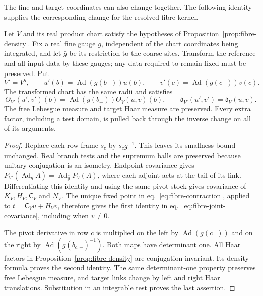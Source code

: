\documentclass[11pt,letterpaper,reqno]{amsart}
\makeatletter
\numberwithin{equation}{section}
\renewcommand{\eqref}[1]{\textup{eq.~\ref{#1}}}
\theoremstyle{definition}
\newcommand{\ms@majorstart}{%
  \pushQED{\qed}\renewcommand{\qedsymbol}{$\blacksquare\square$}}
\newenvironment{corollary}[1][]{\ms@majorstart\ms@corollary[#1]}
  {\popQED\endms@corollary}
\theoremstyle{remark}
\makeatother
\begin{document}
The fine and target coordinates can also change together. The following
identity supplies the corresponding change for the resolved fibre kernel.

\begin{corollary}[Joint gauge covariance]\label{cor:fibre-gauge-covariance}
Let \(V\) and its real product chart satisfy the hypotheses of
Proposition~\ref{prop:fibre-density}. Fix a real fine gauge \(g\),
independent of the chart coordinates being integrated, and let
\(\bar g\) be its restriction to the coarse sites. Transform the
reference and all input data by these gauges; any data required to
remain fixed must be preserved. Put
\[
 V'=V^g,\qquad
 u'(b)=\operatorname{Ad}(g(b_-))u(b),\qquad
 v'(c)=\operatorname{Ad}(\bar g(c_-))v(c).
\]
The transformed chart has the same radii and satisfies
\begin{equation}\label{eq:fibre-joint-covariance}
 \Theta_{V'}(u',v')(b)
   =\operatorname{Ad}(g(b_-))\Theta_V(u,v)(b),\qquad
 \mathfrak d_{V'}(u',v')=\mathfrak d_V(u,v).
\end{equation}
The free Lebesgue measure and target Haar measure are preserved.
Every extra factor, including a test domain, is pulled back through
the inverse change on all of its arguments.
\end{corollary}

\begin{proof}
Replace each row frame \(s_c\) by \(s_cg^{-1}\). This leaves its
smallness bound unchanged. Real branch tests and the supremum balls
are preserved because unitary conjugation is an isometry. Endpoint
covariance gives
\(P_{V'}(\operatorname{Ad}_g A)=\operatorname{Ad}_{\bar g}P_V(A)\),
where each adjoint acts at the tail of its link. Differentiating this
identity and using the same pivot stock gives covariance of
\(K_V,H_V,\mathsf C_V\) and \(N_V\). The unique fixed point in
\eqref{eq:fibre-contraction}, applied to
\(t=\mathsf C_Vu+H_Vv\), therefore gives the first identity in
\eqref{eq:fibre-joint-covariance}, including when \(v\ne0\).

The pivot derivative in row \(c\) is multiplied on the left by
\(\operatorname{Ad}(\bar g(c_-))\) and on the right by
\(\operatorname{Ad}(g(b_{c,-})^{-1})\). Both maps have determinant
one. All Haar factors in Proposition~\ref{prop:fibre-density} are
conjugation invariant. Its density formula proves the second identity.
The same determinant-one property preserves free Lebesgue measure,
and target links change by left and right Haar translations.
Substitution in an integrable test proves the last assertion.
\end{proof}
\end{document}
